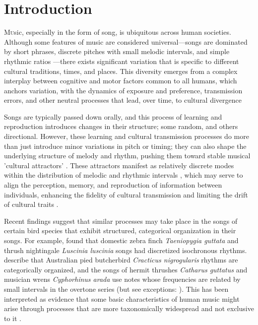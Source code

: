 \section{Introduction}

\lettrine[lines=2]Music, especially in the form of song, is ubiquitous across human societies. Although some features of music are considered universal---songs are dominated by short phrases, discrete pitches with small melodic intervals, and simple rhythmic ratios \autocite{mehr2019, savage2015}---there exists significant variation that is specific to different cultural traditions, times, and places. This diversity emerges from a complex interplay between cognitive and motor factors common to all humans, which anchors variation, with the dynamics of exposure and preference, transmission errors, and other neutral processes that lead, over time, to cultural divergence \autocite{tchernichovski2017,verhoef2021,tierney2011,savage2019,savage2019} 

Songs are typically passed down orally, and this process of learning and reproduction introduces changes in their structure; some random, and others directional. However, these learning and cultural transmission processes do more than just introduce minor variations in pitch or timing; they can also shape the underlying structure of melody and rhythm, pushing them toward stable musical 'cultural attractors' \autocite{claidiere2007, buskell2017}. These attractors manifest as relatively discrete modes within the distribution of melodic and rhythmic intervals \autocite{anglada-tort2023, verhoef2021, jacoby2021}, which may serve to align the perception, memory, and reproduction of information between individuals, enhancing the fidelity of cultural transmission and limiting the drift of cultural traits \autocite{anglada-tort2023, heyes2018a, feher2009, saldana2019, trehub2015, falandays2022}.

Recent findings suggest that similar processes may take place in the songs of certain bird species that exhibit structured, categorical organization in their songs. For example, \textcite{roeske2020} found that domestic zebra finch \textit{Taeniopygia guttata} and thrush nightingale \textit{Luscinia luscinia} songs had discretized isochronous rhythms. \textcite{xing2022} describe that Australian pied butcherbird \textit{Cracticus nigrogularis} rhythms are categorically organized, and the songs of hermit thrushes \textit{Catharus guttatus} \autocite{doolittle2014} and musician wrens \textit{Cyphorhinus arada} \autocite{doolittle2012} use notes whose frequencies are related by small intervals in the overtone series (but see exceptions: \cite{araya-salas2012, dobson1977}). This has been interpreted as evidence that some basic characteristics of human music might arise through processes that are more taxonomically widespread and not exclusive to it \autocite{doolittle2014}.

